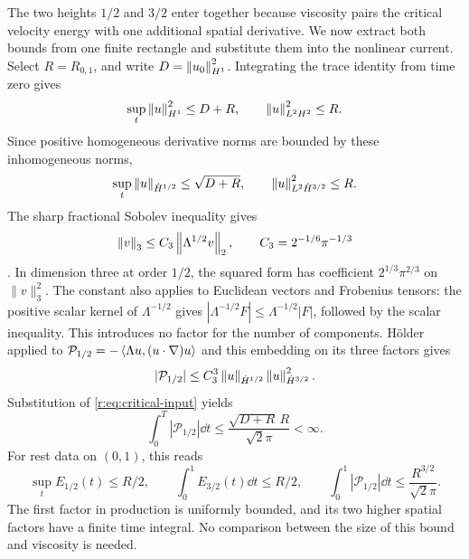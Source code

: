 The two heights \(1/2\) and \(3/2\) enter together because viscosity
pairs the critical velocity energy with one additional spatial derivative.
We now extract both bounds from one finite rectangle and substitute them
into the nonlinear current. Select \(R=R_{0,1}\), and write \(D=\left\lVert u_0\right\rVert_{H^1}^2\).
Integrating the trace identity from time zero gives
\[
 \sup_t\left\lVert u\right\rVert_{H^1}^2\le D+R,
 \qquad \left\lVert u\right\rVert_{L^2H^2}^2\le R.
\]
Since positive homogeneous derivative norms are bounded by these
inhomogeneous norms,
\begin{equation}
 \sup_t\left\lVert u\right\rVert_{\dot H^{1/2}}\le\sqrt{D+R},
 \qquad \left\lVert u\right\rVert_{L^2\dot H^{3/2}}^2\le R.
 \label{r:eq:critical-input}
\end{equation}
The sharp fractional Sobolev inequality gives
\[
 \left\lVert v\right\rVert_3\le C_3\left\lVert \Lambda^{1/2}v\right\rVert_2,\qquad
 C_3=2^{-1/6}\pi^{-1/3}
\]
\cite{Lieb1983,frank-lieb}.
In dimension three at order \(1/2\), the squared form has coefficient
\(2^{1/3}\pi^{2/3}\) on \(\|v\|_3^2\). The constant also applies
to Euclidean vectors and Frobenius tensors: the positive scalar kernel
of \(\Lambda^{-1/2}\) gives
\(|\Lambda^{-1/2}F|\le\Lambda^{-1/2}|F|\), followed by the scalar
inequality. This introduces no factor for the number of components.
H\"older applied to
\(\mathcal P_{1/2}=-\left\langle \Lambda u,(u\cdot\nabla)u\right\rangle\)
and this embedding on its three factors gives
\[
 |\mathcal P_{1/2}|
 \le C_3^3\left\lVert u\right\rVert_{\dot H^{1/2}}
 \left\lVert u\right\rVert_{\dot H^{3/2}}^2.
\]
Substitution of \eqref{r:eq:critical-input} yields
\begin{equation}
 \int_0^T|\mathcal P_{1/2}|\dd t
 \le \frac{\sqrt{D+R}\,R}{\sqrt2\pi}<\infty.
 \label{r:eq:critical-production}
\end{equation}
For rest data on \((0,1)\), this reads
\[
 \sup_t E_{1/2}(t)\le R/2,\qquad
 \int_0^1 E_{3/2}(t)\dd t\le R/2,\qquad
 \int_0^1|\mathcal P_{1/2}|\dd t\le\frac{R^{3/2}}{\sqrt2\pi}.
\]
The first factor in production is uniformly bounded, and its two higher
spatial factors have a finite time integral. No comparison between the
size of this bound and viscosity is needed.

